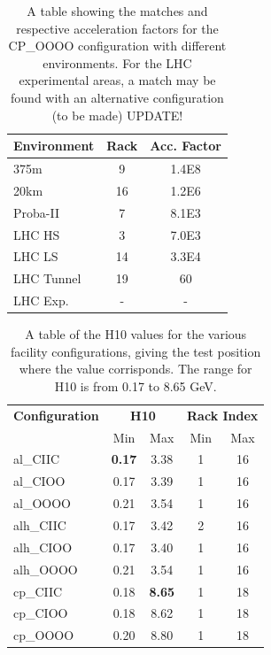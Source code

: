 \documentclass[main.tex]{subfiles}
\begin{document}
\begin{table}[htbp]
  \centering
    \begin{tabular}{l|c|c}
	Environment & Rack & Acc. Factor \\
	\hline
	\hline
	375m		& 9		& 1.4E8 \\
	20km		& 16	& 1.2E6 \\
	Proba-II	& 7		& 8.1E3 \\
	LHC HS		& 3		& 7.0E3 \\
	LHC LS		& 14	& 3.3E4 \\
	LHC Tunnel	& 19	& 60 \\
	LHC Exp. 	& - 	& - \\
    \end{tabular}
	\caption{A table showing the matches and respective acceleration factors for the CP\_OOOO configuration with different environments. For the LHC experimental areas, a match may be found with an alternative configuration (to be made) UPDATE!}
	\label{tab:cp_acc_factors}
\end{table}

\begin{table}[htbp]
  \centering
    \begin{tabular}{l|c|c|c|c}
    \multicolumn{1}{c|}{\textbf{Configuration}} & 
    \multicolumn{2}{c|}{\textbf{H10}} & 
    \multicolumn{2}{c}{\textbf{Rack Index}} \\
    \multicolumn{1}{c|}{\textbf{}} & 
    \multicolumn{1}{c}{Min} & 
    \multicolumn{1}{|c|}{Max} & 
    \multicolumn{1}{c}{Min} & 
    \multicolumn{1}{|c}{Max} \\
	\hline
	\hline
    al\_CIIC & \textbf{0.17} & 3.38  & 1     & 16 \\
    al\_CIOO & 0.17  & 3.39  & 1     & 16 \\
    al\_OOOO & 0.21  & 3.54  & 1     & 16 \\
    alh\_CIIC & 0.17  & 3.42  & 2     & 16 \\
    alh\_CIOO & 0.17  & 3.40  & 1     & 16 \\
    alh\_OOOO & 0.21  & 3.54  & 1     & 16 \\
    cp\_CIIC & 0.18  & \textbf{8.65} & 1     & 18 \\
    cp\_CIOO & 0.18  & 8.62  & 1     & 18 \\
    cp\_OOOO & 0.20  & 8.80  & 1     & 18 \\
    \end{tabular}
	\caption{A table of the H10 values for the various facility configurations, giving the test position where the value corrisponds. The range for H10 is from 0.17 to 8.65 GeV.}
	\label{tab:hardness10}
\end{table}
\end{document}
